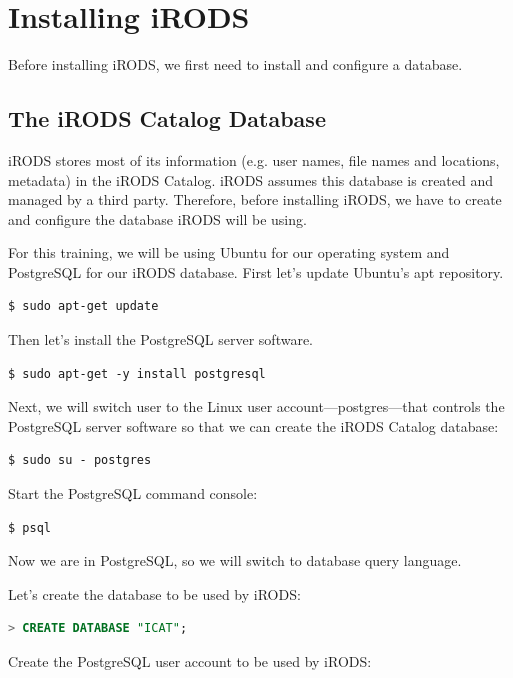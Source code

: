 \documentclass[10pt,oneside]{memoir}
\begin{document}
\chapter{Installing iRODS}

Before installing iRODS, we first need to install and configure a database.

\section{The iRODS Catalog Database}
iRODS stores most of its information (e.g. user names, file names and locations, metadata) in the iRODS Catalog. iRODS assumes this database is created and managed by a third party. Therefore, before installing iRODS, we have to create and configure the database iRODS will be using.


For this training, we will be using Ubuntu for our operating system and PostgreSQL for our iRODS database. First let's update Ubuntu's apt repository.

\begin{lstlisting}
$ sudo apt-get update
\end{lstlisting}

Then let's install the PostgreSQL server software.

\begin{lstlisting}
$ sudo apt-get -y install postgresql
\end{lstlisting}

Next, we will switch user to the Linux user account---postgres---that controls the PostgreSQL server software so that we can create the iRODS Catalog database:

\begin{lstlisting}
$ sudo su - postgres
\end{lstlisting}

Start the PostgreSQL command console:

\begin{lstlisting}
$ psql
\end{lstlisting}

\newpage

Now we are in PostgreSQL, so we will switch to database query language.

Let's create the database to be used by iRODS:

\begin{lstlisting}[language=sql]
> CREATE DATABASE "ICAT";
\end{lstlisting}

Create the PostgreSQL user account to be used by iRODS:
\end{document}
